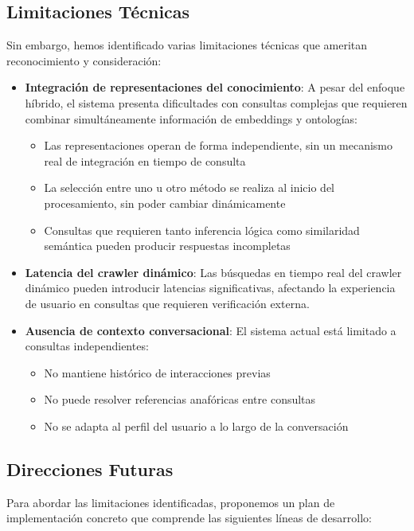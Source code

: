 \documentclass[runningheads]{llncs}
\begin{document}
\subsection{Limitaciones Técnicas}

Sin embargo, hemos identificado varias limitaciones técnicas que ameritan reconocimiento y consideración:

\begin{itemize}
  \item \textbf{Integración de representaciones del conocimiento}: A pesar del enfoque híbrido, el sistema presenta dificultades con consultas complejas que requieren combinar simultáneamente información de embeddings y ontologías:
  \begin{itemize}
    \item Las representaciones operan de forma independiente, sin un mecanismo real de integración en tiempo de consulta
    \item La selección entre uno u otro método se realiza al inicio del procesamiento, sin poder cambiar dinámicamente
    \item Consultas que requieren tanto inferencia lógica como similaridad semántica pueden producir respuestas incompletas
  \end{itemize}

  
  \item \textbf{Latencia del crawler dinámico}: Las búsquedas en tiempo real del crawler dinámico pueden introducir latencias significativas, afectando la experiencia de usuario en consultas que requieren verificación externa.
  
  \item \textbf{Ausencia de contexto conversacional}: El sistema actual está limitado a consultas independientes:
  \begin{itemize}
    \item No mantiene histórico de interacciones previas
    \item No puede resolver referencias anafóricas entre consultas
    \item No se adapta al perfil del usuario a lo largo de la conversación
  \end{itemize}
\end{itemize}

\subsection{Direcciones Futuras}

Para abordar las limitaciones identificadas, proponemos un plan de implementación concreto que comprende las siguientes líneas de desarrollo:
\end{document}
